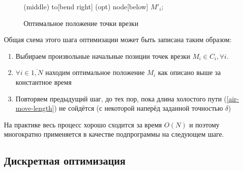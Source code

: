 \documentclass[10pt]{SPIIRAS_Proceedings}
\begin{document}
\begin{figure}
{{       (middle) to[bend right] (opt) node[below] {$M'_i$};
    }
  }
  \caption{Оптимальное положение точки врезки}
  \label{shift-pierce-point}
\end{figure}

Общая схема этого шага оптимизации может быть записана таким образом:
\begin{enumerate}
  \item
  Выбираем произвольные начальные позиции точек врезки
  $M_i \in C_i, \forall i$.
  \item
  $\forall i \in \overline{1,N}$
  находим оптимальное положение
  $M_i$
  как описано выше за константное время
  \item
  Повторяем предыдущий шаг,
  до тех пор,
  пока длина холостого пути
  (\ref{air-move-length})
  не сойдётся
  (с некоторой наперёд заданной точностью $\delta$)
\end{enumerate}

На практике весь процесс хорошо сходится
за время
$O(N)$
и поэтому многократно применяется
в качестве подпрограммы на следующем шаге.

\subsection{Дискретная оптимизация}
\end{document}
